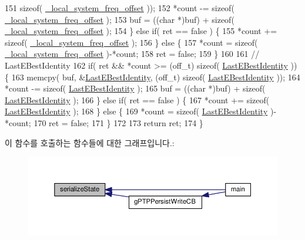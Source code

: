 \begin{DoxyCode}
151             \textcolor{keyword}{sizeof}( \hyperlink{class_i_e_e_e1588_clock_ad28017a023b91ce56dba976677a7ce1a}{\_local\_system\_freq\_offset} ));
152       *count -= \textcolor{keyword}{sizeof}( \hyperlink{class_i_e_e_e1588_clock_ad28017a023b91ce56dba976677a7ce1a}{\_local\_system\_freq\_offset} );
153       buf = ((\textcolor{keywordtype}{char} *)buf) + \textcolor{keyword}{sizeof}( \hyperlink{class_i_e_e_e1588_clock_ad28017a023b91ce56dba976677a7ce1a}{\_local\_system\_freq\_offset} );
154   \} \textcolor{keywordflow}{else} \textcolor{keywordflow}{if}( ret == \textcolor{keyword}{false} ) \{
155       *count += \textcolor{keyword}{sizeof}( \hyperlink{class_i_e_e_e1588_clock_ad28017a023b91ce56dba976677a7ce1a}{\_local\_system\_freq\_offset} );
156   \} \textcolor{keywordflow}{else} \{
157       *count = \textcolor{keyword}{sizeof}( \hyperlink{class_i_e_e_e1588_clock_ad28017a023b91ce56dba976677a7ce1a}{\_local\_system\_freq\_offset} )-*count;
158       ret = \textcolor{keyword}{false};
159   \}
160 
161   \textcolor{comment}{// LastEBestIdentity}
162   \textcolor{keywordflow}{if}( ret && *count >= (off\_t) \textcolor{keyword}{sizeof}( \hyperlink{class_i_e_e_e1588_clock_aecec9d272ce3010f56716cdaf7bd1e5c}{LastEBestIdentity} )) \{
163     memcpy( buf, &\hyperlink{class_i_e_e_e1588_clock_aecec9d272ce3010f56716cdaf7bd1e5c}{LastEBestIdentity}, (off\_t) \textcolor{keyword}{sizeof}( 
      \hyperlink{class_i_e_e_e1588_clock_aecec9d272ce3010f56716cdaf7bd1e5c}{LastEBestIdentity} ));
164     *count -= \textcolor{keyword}{sizeof}( \hyperlink{class_i_e_e_e1588_clock_aecec9d272ce3010f56716cdaf7bd1e5c}{LastEBestIdentity} );
165     buf = ((\textcolor{keywordtype}{char} *)buf) + \textcolor{keyword}{sizeof}( \hyperlink{class_i_e_e_e1588_clock_aecec9d272ce3010f56716cdaf7bd1e5c}{LastEBestIdentity} );
166   \} \textcolor{keywordflow}{else} \textcolor{keywordflow}{if}( ret == \textcolor{keyword}{false} ) \{
167     *count += \textcolor{keyword}{sizeof}( \hyperlink{class_i_e_e_e1588_clock_aecec9d272ce3010f56716cdaf7bd1e5c}{LastEBestIdentity} );
168   \} \textcolor{keywordflow}{else} \{
169     *count = \textcolor{keyword}{sizeof}( \hyperlink{class_i_e_e_e1588_clock_aecec9d272ce3010f56716cdaf7bd1e5c}{LastEBestIdentity} )-*count;
170     ret = \textcolor{keyword}{false};
171   \}
172 
173   \textcolor{keywordflow}{return} ret;
174 \}
\end{DoxyCode}


이 함수를 호출하는 함수들에 대한 그래프입니다.\+:
\nopagebreak
\begin{figure}[H]
\begin{center}
\leavevmode
\includegraphics[width=350pt]{class_i_e_e_e1588_clock_a7ae77a9c4cc2f66b95fe47a58b571113_icgraph}
\end{center}
\end{figure}


